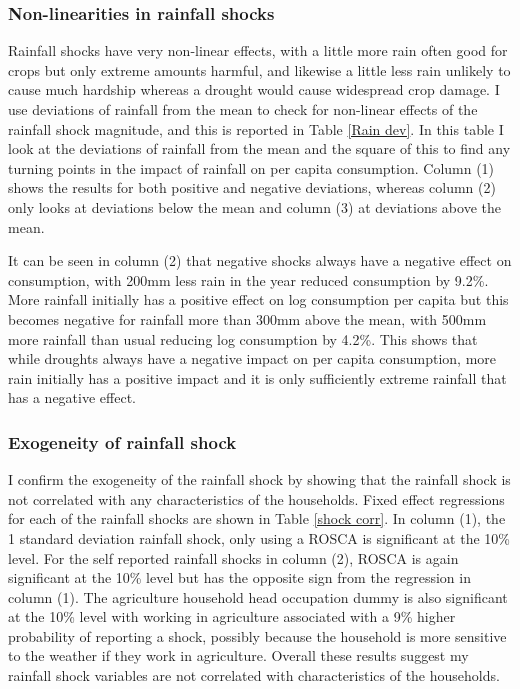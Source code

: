 

\subsubsection{Non-linearities in rainfall shocks}
Rainfall shocks have very non-linear effects, with a little more rain often good for crops but only extreme amounts harmful, and likewise a little less rain unlikely to cause much hardship whereas a drought would cause widespread crop damage. I use deviations of rainfall from the mean to check for non-linear effects of the rainfall shock magnitude, and this is reported in Table \ref{Rain dev}. In this table I look at the deviations of rainfall from the mean and the square of this to find any turning points in the impact of rainfall on per capita consumption. Column (1) shows the results for both positive and negative deviations, whereas column (2) only looks at deviations below the mean and column (3) at deviations above the mean. 

It can be seen in column (2) that negative shocks always have a negative effect on consumption, with 200mm less rain in the year reduced consumption by 9.2\%. More rainfall initially has a positive effect on log consumption per capita but this becomes negative for rainfall more than 300mm above the mean, with 500mm more rainfall than usual reducing log consumption by 4.2\%. This shows that while droughts always have a negative impact on per capita consumption, more rain initially has a positive impact and it is only sufficiently extreme rainfall that has a negative effect. 


\subsubsection{Exogeneity of rainfall shock}
I confirm the exogeneity of the rainfall shock by showing that the rainfall shock is not correlated with any characteristics of the households. Fixed effect regressions for each of the rainfall shocks are shown in Table \ref{shock corr}. In column (1), the 1 standard deviation rainfall shock, only using a ROSCA is significant at the 10\% level. For the self reported rainfall shocks in column (2), ROSCA is again significant at the 10\% level but has the opposite sign from the regression in column (1). The agriculture household head occupation dummy is also significant at the 10\% level with working in agriculture associated with a 9\% higher probability of reporting a shock, possibly because the household is more sensitive to the weather if they work in agriculture. Overall these results suggest my rainfall shock variables are not correlated with characteristics of the households. 

